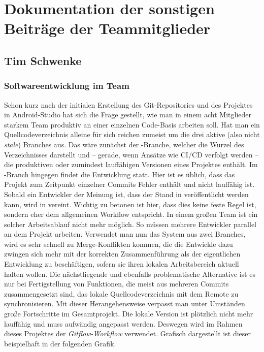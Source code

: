 \section{Dokumentation der sonstigen Beiträge der Teammitglieder}

\subsection{Tim Schwenke}

\subsubsection{Softwareentwicklung im Team}

Schon kurz nach der initialen Erstellung des Git-Repositories und des Projektes in Android-Studio hat sich die Frage gestellt, wie man in einem acht Mitglieder starkem Team produktiv an einer einzelnen Code-Basis arbeiten soll. Hat man ein Quellcodeverzeichnis alleine für sich reichen zumeist um die drei aktive (also nicht \textit{stale}) Branches aus. Das wäre zunächst der -Branche, welcher die Wurzel des Verzeichnisses darstellt und – gerade, wenn Ansätze wie CI/CD verfolgt werden – die produktiven oder zumindest lauffähigen Versionen eines Projektes enthält. Im -Branch hingegen findet die Entwicklung statt. Hier ist es üblich, dass das Projekt zum Zeitpunkt einzelner Commits Fehler enthält und nicht lauffähig ist. Sobald ein Entwickler der Meinung ist, dass der Stand in  veröffentlicht werden kann, wird  in  vereint. Wichtig zu betonen ist hier, dass dies keine feste Regel ist, sondern eher dem allgemeinen Workflow entspricht. In einem großen Team ist ein solcher Arbeitsablauf nicht mehr möglich. So müssen mehrere Entwickler parallel an dem Projekt arbeiten. Verwendet man nun das System aus zwei Branches, wird es sehr schnell zu Merge-Konflikten kommen, die die Entwickle dazu zwingen sich mehr mit der korrekten Zusammenführung als der eigentlichen Entwicklung zu beschäftigen, sofern sie ihren lokalen Arbeitsbereich aktuell halten wollen. Die nächstliegende und ebenfalls problematische Alternative ist es nur bei Fertigstellung von Funktionen, die meist aus mehreren Commits zusammengesetzt sind, das lokale Quellcodeverzeichnis mit dem Remote zu synchronisieren. Mit dieser Herangehensweise verpasst man unter Umständen große Fortschritte im Gesamtprojekt. Die lokale Version ist plötzlich nicht mehr lauffähig und muss aufwändig angepasst werden. Deswegen wird im Rahmen dieses Projektes der\textit{ Gitflow-Workflow} verwendet. Grafisch dargestellt ist dieser beispielhaft in der folgenden Grafik.


